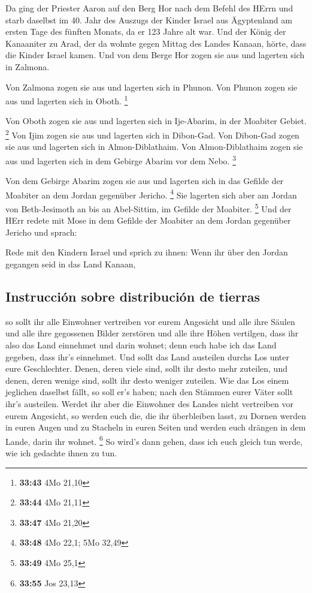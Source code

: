  Da ging der Priester Aaron auf den Berg Hor nach dem
Befehl des HErrn und starb daselbst im 40. Jahr des Auszugs der Kinder
Israel aus Ägyptenland am ersten Tage des fünften Monats,
 da er 123 Jahre alt war.  Und der König
der Kanaaniter zu Arad, der da wohnte gegen Mittag des Landes Kanaan,
hörte, dass die Kinder Israel kamen.  Und von dem Berge
Hor zogen sie aus und lagerten sich in Zalmona.

 Von Zalmona zogen sie aus und lagerten sich in Phunon.
 Von Phunon zogen sie aus und lagerten sich in Oboth.
\footnote{\textbf{33:43} 4Mo 21,10}

 Von Oboth zogen sie aus und lagerten sich in Ije-Abarim,
in der Moabiter Gebiet. \footnote{\textbf{33:44} 4Mo 21,11}
 Von Ijim zogen sie aus und lagerten sich in Dibon-Gad.
 Von Dibon-Gad zogen sie aus und lagerten sich in
Almon-Diblathaim.  Von Almon-Diblathaim zogen sie aus und
lagerten sich in dem Gebirge Abarim vor dem Nebo. \footnote{\textbf{33:47}
  4Mo 21,20}

 Von dem Gebirge Abarim zogen sie aus und lagerten sich
in das Gefilde der Moabiter an dem Jordan gegenüber Jericho. \footnote{\textbf{33:48}
  4Mo 22,1; 5Mo 32,49}  Sie lagerten sich aber am Jordan
von Beth-Jesimoth an bis an Abel-Sittim, im Gefilde der Moabiter.
\footnote{\textbf{33:49} 4Mo 25,1}  Und der HErr redete
mit Mose in dem Gefilde der Moabiter an dem Jordan gegenüber Jericho und
sprach:

 Rede mit den Kindern Israel und sprich zu ihnen: Wenn
ihr über den Jordan gegangen seid in das Land Kanaan,

\hypertarget{instrucciuxf3n-sobre-distribuciuxf3n-de-tierras}{%
\subsection{Instrucción sobre distribución de
tierras}\label{instrucciuxf3n-sobre-distribuciuxf3n-de-tierras}}

 so sollt ihr alle Einwohner vertreiben vor eurem
Angesicht und alle ihre Säulen und alle ihre gegossenen Bilder zerstören
und alle ihre Höhen vertilgen,  dass ihr also das Land
einnehmet und darin wohnet; denn euch habe ich das Land gegeben, dass
ihr's einnehmet.  Und sollt das Land austeilen durchs Los
unter eure Geschlechter. Denen, deren viele sind, sollt ihr desto mehr
zuteilen, und denen, deren wenige sind, sollt ihr desto weniger
zuteilen. Wie das Los einem jeglichen daselbst fällt, so soll er's
haben; nach den Stämmen eurer Väter sollt ihr's austeilen.
 Werdet ihr aber die Einwohner des Landes nicht
vertreiben vor eurem Angesicht, so werden euch die, die ihr überbleiben
lasst, zu Dornen werden in euren Augen und zu Stacheln in euren Seiten
und werden euch drängen in dem Lande, darin ihr wohnet. \footnote{\textbf{33:55}
  Jos 23,13}  So wird's dann gehen, dass ich euch gleich
tun werde, wie ich gedachte ihnen zu tun.

